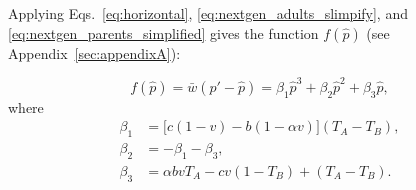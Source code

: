 \documentclass[12pt]{extarticle}
\begin{document}
{%
%

Applying Eqs.\ \ref{eq:horizontal}, \ref{eq:nextgen_adults_slimpify}, and \ref{eq:nextgen_parents_simplified} gives the function $f(\hat{p})$ (see Appendix~\autoref{sec:appendixA}):

\begin{equation} \label{eq:general_case_polynomial}
  f(\hat{p}) = \bar{w}(\hat{p}'-\hat{p}) =
  \beta_1 \hat{p}^3 + \beta_2 \hat{p}^2 + \beta_3 \hat{p},
\end{equation}
where 
\begin{equation} \label{eq:polynomial_coefficients}
\begin{aligned}
\beta_1 &= \big[c(1-v) - b (1-\alpha v)\big] (T_A-T_B) , \\
\beta_2 &= -\beta_1 -\beta_3 ,  \\
\beta_3 &= \alpha bvT_A - cv(1-T_B) + (T_A-T_B) .
\end{aligned}
\end{equation}

}
\end{document}
